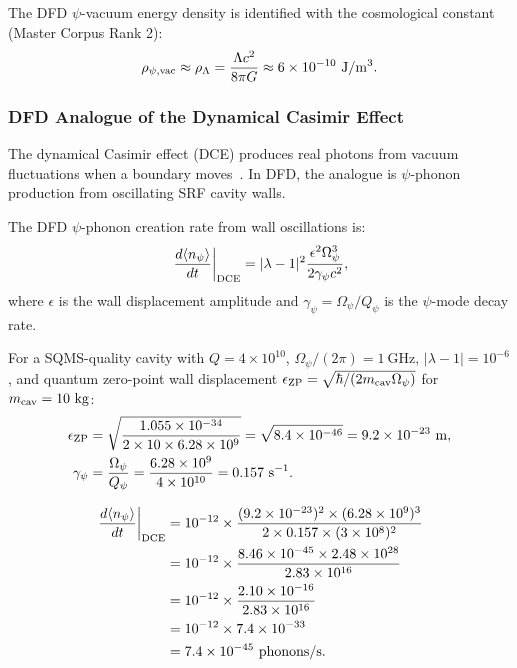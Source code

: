 \documentclass[aps,prd,twocolumn,superscriptaddress]{revtex4-2}
\newcommand{\Qpsi}{Q_\psi}
\newcommand{\Opsi}{\Omega_\psi}
\newcommand{\lam}{|\lambda-1|}
\begin{document}
The DFD $\psi$-vacuum energy density is identified with the cosmological
constant (Master Corpus Rank 2):
\begin{equation}
\rho_{\psi,\rm vac} \approx \rho_\Lambda
= \frac{\Lambda c^2}{8\pi G} \approx 6\times 10^{-10}~\mathrm{J/m^3}.
\end{equation}

\subsubsection{DFD Analogue of the Dynamical Casimir Effect}

The dynamical Casimir effect (DCE) produces real photons from vacuum
fluctuations when a boundary moves~\cite{Dodonov2025}.  In DFD, the
analogue is $\psi$-phonon production from oscillating SRF cavity walls.

The DFD $\psi$-phonon creation rate from wall oscillations is:
\begin{equation}
\left.\frac{d\langle n_\psi\rangle}{dt}\right|_{\rm DCE}
= \lam^2\frac{\epsilon^2\Opsi^3}{2\gamma_\psi c^2},
\end{equation}
where $\epsilon$ is the wall displacement amplitude and
$\gamma_\psi = \Opsi/\Qpsi$ is the $\psi$-mode decay rate.

For a SQMS-quality cavity with $Q = 4\times 10^{10}$,
$\Opsi/(2\pi) = 1~\mathrm{GHz}$, $\lam = 10^{-6}$, and
quantum zero-point wall displacement
$\epsilon_{\rm ZP} = \sqrt{\hbar/(2m_{\rm cav}\Opsi)}$ for
$m_{\rm cav} = 10~\mathrm{kg}$:
\begin{align}
\epsilon_{\rm ZP} &= \sqrt{\frac{1.055\times 10^{-34}}{2\times 10\times 6.28\times 10^9}}
= \sqrt{8.4\times 10^{-46}} = 9.2\times 10^{-23}~\mathrm{m}, \\
\gamma_\psi &= \frac{\Opsi}{\Qpsi}
= \frac{6.28\times 10^9}{4\times 10^{10}} = 0.157~\mathrm{s^{-1}}.
\end{align}

\begin{align}
\left.\frac{d\langle n_\psi\rangle}{dt}\right|_{\rm DCE}
&= 10^{-12}\times
\frac{(9.2\times 10^{-23})^2\times(6.28\times 10^9)^3}{2\times 0.157\times(3\times 10^8)^2} \notag\\
&= 10^{-12}\times
\frac{8.46\times 10^{-45}\times 2.48\times 10^{28}}{2.83\times 10^{16}} \notag\\
&= 10^{-12}\times
\frac{2.10\times 10^{-16}}{2.83\times 10^{16}} \notag\\
&= 10^{-12}\times 7.4\times 10^{-33} \notag\\
&= 7.4\times 10^{-45}~\mathrm{phonons/s}.
\end{align}
\end{document}

